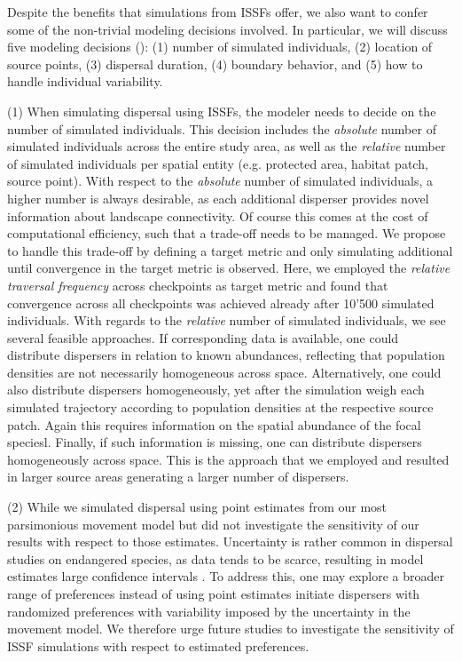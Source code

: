 \documentclass[abstract=on,10pt,a4paper,bibliography=totocnumbered]{article}
\begin{document}
Despite the benefits that simulations from ISSFs offer, we also want to confer
some of the non-trivial modeling decisions involved. In particular, we will
discuss five modeling decisions (): (1) number of
simulated individuals, (2) location of source points, (3) dispersal duration,
(4) boundary behavior, and (5) how to handle individual variability.

(1) When simulating dispersal using ISSFs, the modeler needs to decide on the
number of simulated individuals. This decision includes the \textit{absolute}
number of simulated individuals across the entire study area, as well as the
\textit{relative} number of simulated individuals per spatial entity (e.g.
protected area, habitat patch, source point). With respect to the
\textit{absolute} number of simulated individuals, a higher number is always
desirable, as each additional disperser provides novel information about
landscape connectivity. Of course this comes at the cost of computational
efficiency, such that a trade-off needs to be managed. We propose to handle this
trade-off by defining a target metric and only simulating additional until
convergence in the target metric is observed. Here, we employed the
\textit{relative traversal frequency} across checkpoints as target metric and
found that convergence across all checkpoints was achieved already after 10'500
simulated individuals. With regards to the \textit{relative} number of simulated
individuals, we see several feasible approaches. If corresponding data is
available, one could distribute dispersers in relation to known abundances,
reflecting that population densities are not necessarily homogeneous across
space. Alternatively, one could also distribute dispersers homogeneously, yet
after the simulation weigh each simulated trajectory according to population
densities at the respective source patch. Again this requires information on the
spatial abundance of the focal speciesl. Finally, if such information is
missing, one can distribute dispersers homogeneously across space. This is the
approach that we employed and resulted in larger source areas generating a
larger number of dispersers.

(2) While we simulated dispersal using point estimates from our most
parsimonious movement model but did not investigate the sensitivity of our
results with respect to those estimates. Uncertainty is rather common in
dispersal studies on endangered species, as data tends to be scarce, resulting
in model estimates large confidence intervals \citep{Wiegand.2003,
KramerSchadt.2007}. To address this, one may explore a broader range of
preferences instead of using point estimates initiate dispersers with randomized
preferences with variability imposed by the uncertainty in the movement model.
We therefore urge future studies to investigate the sensitivity of ISSF
simulations with respect to estimated preferences.
\end{document}
